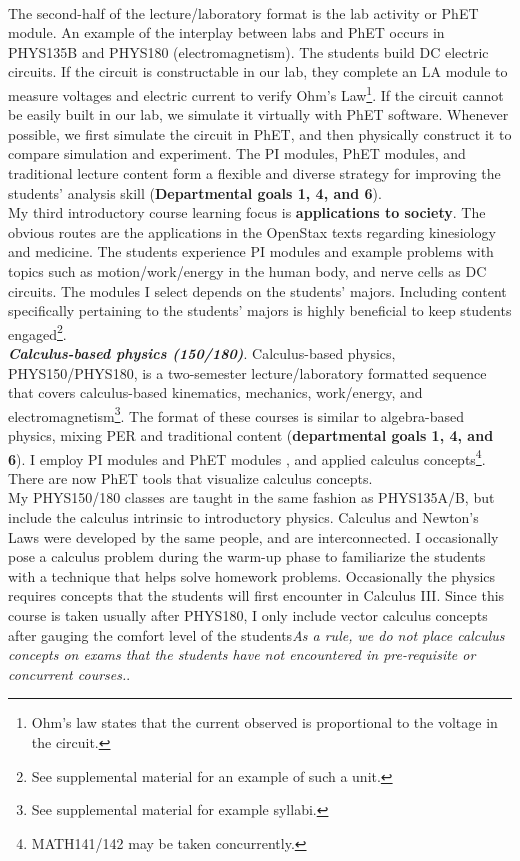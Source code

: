 \documentclass[../../../main.tex]{subfiles}
\begin{document}
\\
\vspace{0.15cm}
The second-half of the lecture/laboratory format is the lab activity or PhET module.  An example of the interplay between labs and PhET occurs in PHYS135B and PHYS180 (electromagnetism).  The students build DC electric circuits.  If the circuit is constructable in our lab, they complete an LA module to measure voltages and electric current to verify Ohm's Law\footnote{Ohm's law states that the current observed is proportional to the voltage in the circuit.}.  If the circuit cannot be easily built in our lab, we simulate it virtually with PhET software.  Whenever possible, we first simulate the circuit in PhET, and then physically construct it to compare simulation and experiment.  The PI modules, PhET modules, and traditional lecture content form a flexible and diverse strategy for improving the students' analysis skill (\textbf{Departmental goals 1, 4, and 6}).
\\
\vspace{0.15cm}
My third introductory course learning focus is \textbf{applications to society}.  The obvious routes are the applications in the OpenStax texts \cite{openstax1} regarding kinesiology and medicine.  The students experience PI modules and example problems with topics such as motion/work/energy in the human body, and nerve cells as DC circuits.  The modules I select depends on the students' majors.  Including content specifically pertaining to the students' majors is highly beneficial to keep students engaged\footnote{See supplemental material for an example of such a unit.}.
\\
\vspace{0.15cm}
\textbf{\textit{Calculus-based physics (150/180)}}. Calculus-based physics, PHYS150/PHYS180, is a two-semester lecture/laboratory formatted sequence that covers calculus-based kinematics, mechanics, work/energy, and electromagnetism\footnote{See supplemental material for example syllabi.}.  The format of these courses is similar to algebra-based physics, mixing PER and traditional content (\textbf{departmental goals 1, 4, and 6}).  I employ PI modules \cite{mazur2013peer} and PhET modules \cite{phet}, and applied calculus concepts\footnote{MATH141/142 may be taken concurrently.}.  There are now PhET tools that visualize calculus concepts.
\\
\vspace{0.15cm}
My PHYS150/180 classes are taught in the same fashion as PHYS135A/B, but include the calculus intrinsic to introductory physics.  Calculus and Newton's Laws were developed by the same people, and are interconnected.  I occasionally pose a calculus problem during the warm-up phase to familiarize the students with a technique that helps solve homework problems.  Occasionally the physics requires concepts that the students will first encounter in Calculus III.  Since this course is taken usually after PHYS180, I only include vector calculus concepts after gauging the comfort level of the students\textit{As a rule, we do not place calculus concepts on exams that the students have not encountered in pre-requisite or concurrent courses.}.
\end{document}
